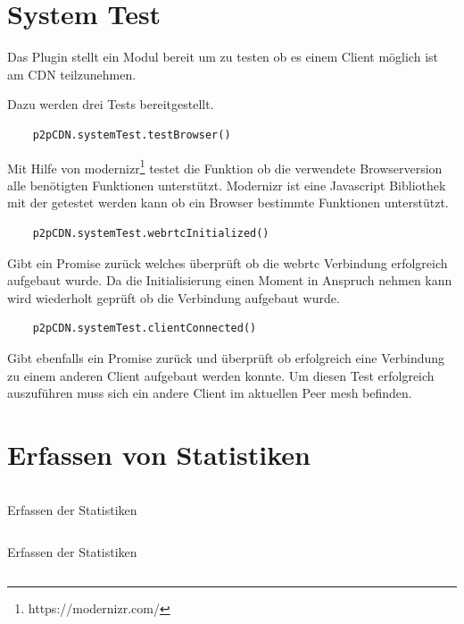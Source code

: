\begin{description}
\section{System Test}
Das Plugin stellt ein Modul bereit um zu testen ob es einem Client möglich ist am \pTp CDN teilzunehmen.

Dazu werden drei Tests bereitgestellt.
\begin{lstlisting}
	p2pCDN.systemTest.testBrowser()
\end{lstlisting}
 Mit Hilfe von modernizr\footnote{https://modernizr.com/} testet die Funktion ob die verwendete Browserversion alle benötigten Funktionen unterstützt. Modernizr ist eine Javascript Bibliothek mit der getestet werden kann ob ein Browser bestimmte Funktionen unterstützt.
\begin{lstlisting}
	p2pCDN.systemTest.webrtcInitialized()
\end{lstlisting}
Gibt ein Promise zurück welches überprüft ob die webrtc Verbindung erfolgreich aufgebaut wurde. Da die Initialisierung einen Moment in Anspruch nehmen kann wird wiederholt geprüft ob die Verbindung aufgebaut wurde.
\begin{lstlisting}
	p2pCDN.systemTest.clientConnected()
\end{lstlisting}
Gibt ebenfalls ein Promise zurück und überprüft ob erfolgreich eine Verbindung zu einem anderen Client aufgebaut werden konnte. Um diesen Test erfolgreich auszuführen muss sich ein andere Client im aktuellen Peer mesh befinden.

\section{Erfassen von Statistiken}\label{ch:implementation:stats}
\begin{listing}[h]
	\inputminted{javascript}{listings/sendStatistic.js}
	\caption{Erfassen der Statistiken}
	\label{lst:code-stats}
\end{listing}
\begin{listing}[h]
	\inputminted{javascript}{listings/logStatistic.js}
	\caption{Erfassen der Statistiken}
	\label{lst:code-stats}
\end{listing}

\begin{listing}[h]
	\inputminted{javascript}{listings/_handle_chunk.js}
	\caption{}
	\label{lst:handle_chunk}
\end{listing}


\end{description}
